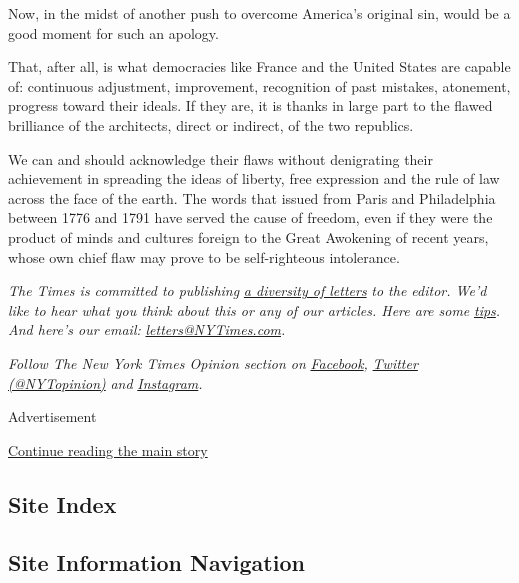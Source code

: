 Now, in the midst of another push to overcome America's original sin,
would be a good moment for such an apology.

That, after all, is what democracies like France and the United States
are capable of: continuous adjustment, improvement, recognition of past
mistakes, atonement, progress toward their ideals. If they are, it is
thanks in large part to the flawed brilliance of the architects, direct
or indirect, of the two republics.

We can and should acknowledge their flaws without denigrating their
achievement in spreading the ideas of liberty, free expression and the
rule of law across the face of the earth. The words that issued from
Paris and Philadelphia between 1776 and 1791 have served the cause of
freedom, even if they were the product of minds and cultures foreign to
the Great Awokening of recent years, whose own chief flaw may prove to
be self-righteous intolerance.

\emph{The Times is committed to publishing}
\href{https://www.nytimes3xbfgragh.onion/2019/01/31/opinion/letters/letters-to-editor-new-york-times-women.html}{\emph{a
diversity of letters}} \emph{to the editor. We'd like to hear what you
think about this or any of our articles. Here are some}
\href{https://help.nytimes3xbfgragh.onion/hc/en-us/articles/115014925288-How-to-submit-a-letter-to-the-editor}{\emph{tips}}\emph{.
And here's our email:}
\href{mailto:letters@NYTimes.com}{\emph{letters@NYTimes.com}}\emph{.}

\emph{Follow The New York Times Opinion section on}
\href{https://www.facebookcorewwwi.onion/nytopinion}{\emph{Facebook}}\emph{,}
\href{http://twitter.com/NYTOpinion}{\emph{Twitter (@NYTopinion)}}
\emph{and}
\href{https://www.instagram.com/nytopinion/}{\emph{Instagram}}\emph{.}

Advertisement

\protect\hyperlink{after-bottom}{Continue reading the main story}

\hypertarget{site-index}{%
\subsection{Site Index}\label{site-index}}

\hypertarget{site-information-navigation}{%
\subsection{Site Information
Navigation}\label{site-information-navigation}}

